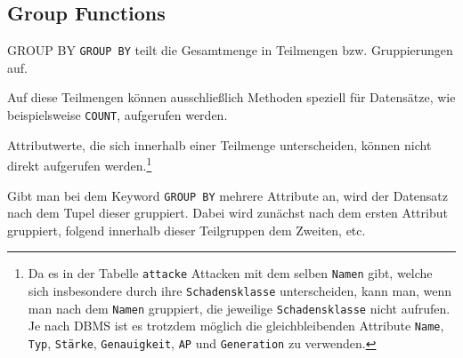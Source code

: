 \subsection{Group Functions}

\begin{sql}{GROUP BY}
    \texttt{GROUP BY} teilt die Gesamtmenge in Teilmengen bzw. Gruppierungen auf.

    Auf diese Teilmengen können ausschließlich Methoden speziell für Datensätze, wie beispielsweise \texttt{COUNT}, aufgerufen werden.

    Attributwerte, die sich innerhalb einer Teilmenge unterscheiden, können nicht direkt aufgerufen werden.\footnote{
        Da es in der Tabelle \texttt{attacke} Attacken mit dem selben \texttt{Namen} gibt, welche sich insbesondere durch ihre \texttt{Schadensklasse} unterscheiden, kann man, wenn man nach dem \texttt{Namen} gruppiert, die jeweilige \texttt{Schadensklasse} nicht aufrufen.
        Je nach DBMS ist es trotzdem möglich die gleichbleibenden Attribute \texttt{Name}, \texttt{Typ}, \texttt{Stärke}, \texttt{Genauigkeit}, \texttt{AP} und \texttt{Generation} zu verwenden.
    }

    Gibt man bei dem Keyword \texttt{GROUP BY} mehrere Attribute an, wird der Datensatz nach dem Tupel dieser gruppiert.
    Dabei wird zunächst nach dem ersten Attribut gruppiert, folgend innerhalb dieser Teilgruppen dem Zweiten, etc.
\end{sql}

